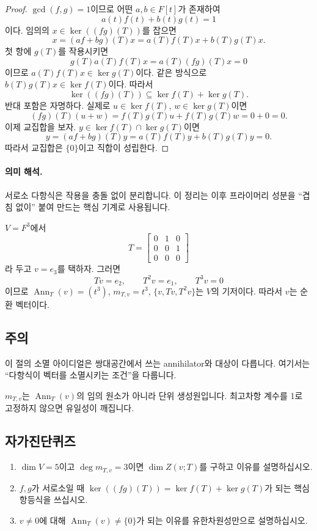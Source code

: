 \begin{proof}
$\gcd(f,g)=1$이므로 어떤 $a,b\in F[t]$가 존재하여
\[
a(t)f(t)+b(t)g(t)=1
\]
이다. 임의의 $x\in\ker((fg)(T))$를 잡으면
\[
x=(af+bg)(T)x=a(T)f(T)x+b(T)g(T)x.
\]
첫 항에 $g(T)$를 작용시키면
\[
g(T)a(T)f(T)x=a(T)(fg)(T)x=0
\]
이므로 $a(T)f(T)x\in\ker g(T)$이다. 같은 방식으로 $b(T)g(T)x\in\ker f(T)$이다. 따라서
\[
\ker((fg)(T))\subseteq \ker f(T)+\ker g(T).
\]
반대 포함은 자명하다. 실제로 $u\in\ker f(T)$, $w\in\ker g(T)$이면
\[
(fg)(T)(u+w)=f(T)g(T)u+f(T)g(T)w=0+0=0.
\]
이제 교집합을 보자. $y\in\ker f(T)\cap\ker g(T)$이면
\[
y=(af+bg)(T)y=a(T)f(T)y+b(T)g(T)y=0.
\]
따라서 교집합은 $\{0\}$이고 직합이 성립한다.
\end{proof}

\paragraph{의미 해석.}
서로소 다항식은 작용을 충돌 없이 분리합니다. 이 정리는 이후 프라이머리 성분을 ``겹침 없이'' 붙여 만드는 핵심 기계로 사용됩니다.

\begin{example}
$V=F^3$에서
\[
T=\begin{bmatrix}
0&1&0\\
0&0&1\\
0&0&0
\end{bmatrix}
\]
라 두고 $v=e_3$를 택하자. 그러면
\[
Tv=e_2,\qquad T^2v=e_1,\qquad T^3v=0
\]
이므로 $\operatorname{Ann}_T(v)=(t^3)$, $m_{T,v}=t^3$, $\{v,Tv,T^2v\}$는 $V$의 기저이다. 따라서 $v$는 순환 벡터이다.
\end{example}

\subsection*{주의}
\begin{warning}
이 절의 소멸 아이디얼은 쌍대공간에서 쓰는 annihilator와 대상이 다릅니다. 여기서는 ``다항식이 벡터를 소멸시키는 조건''을 다룹니다.
\end{warning}
\begin{warning}
$m_{T,v}$는 $\operatorname{Ann}_T(v)$의 임의 원소가 아니라 단위 생성원입니다. 최고차항 계수를 1로 고정하지 않으면 유일성이 깨집니다.
\end{warning}

\subsection*{자가진단퀴즈}
\begin{enumerate}[label=\arabic*.]
\item $\dim V=5$이고 $\deg m_{T,v}=3$이면 $\dim Z(v;T)$를 구하고 이유를 설명하십시오.
\item $f,g$가 서로소일 때 $\ker((fg)(T))=\ker f(T)+\ker g(T)$가 되는 핵심 항등식을 쓰십시오.
\item $v\ne0$에 대해 $\operatorname{Ann}_T(v)\ne\{0\}$가 되는 이유를 유한차원성만으로 설명하십시오.
\end{enumerate}

